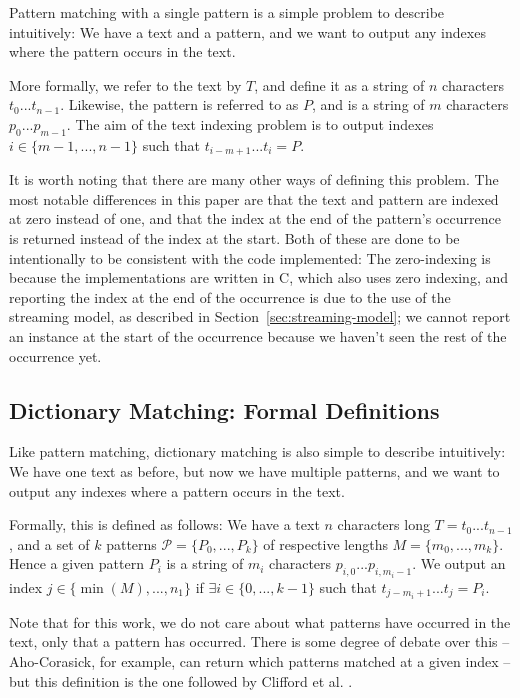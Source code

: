 \documentclass[ %
                    author={Dominic Joseph Moylett},
                    degree={MEng},
                     title={Dictionary Matching with Fingerprints},
                  subtitle={An Empirical Analysis},
                      type={research},
                      year={2015} ]{dissertation}
\begin{document}
Pattern matching with a single pattern is a simple problem to describe intuitively: We have a text and a pattern, and we want to output any indexes where the pattern occurs in the text.

More formally, we refer to the text by $T$, and define it as a string of $n$ characters $t_0...t_{n-1}$. Likewise, the pattern is referred to as $P$, and is a string of $m$ characters $p_0...p_{m-1}$. The aim of the text indexing problem is to output indexes $i \in \{m-1,...,n-1\}$ such that $t_{i-m+1}...t_{i} = P$.

It is worth noting that there are many other ways of defining this problem. The most notable differences in this paper are that the text and pattern are indexed at zero instead of one, and that the index at the end of the pattern's occurrence is returned instead of the index at the start. Both of these are done to be intentionally to be consistent with the code implemented: The zero-indexing is because the implementations are written in C, which also uses zero indexing, and reporting the index at the end of the occurrence is due to the use of the streaming model, as described in Section~\ref{sec:streaming-model}; we cannot report an instance at the start of the occurrence because we haven't seen the rest of the occurrence yet.

\subsection{Dictionary Matching: Formal Definitions}
\label{ssec:dict-matching:definitions}

Like pattern matching, dictionary matching is also simple to describe intuitively: We have one text as before, but now we have multiple patterns, and we want to output any indexes where a pattern occurs in the text.

Formally, this is defined as follows: We have a text $n$ characters long $T = t_0...t_{n-1}$, and a set of $k$ patterns $\mathcal{P} = \{P_0,...,P_k\}$ of respective lengths $M = \{m_0,...,m_k\}$. Hence a given pattern $P_i$ is a string of $m_i$ characters $p_{i,0}...p_{i,m_i-1}$. We output an index $j \in \{\min(M),...,n_1\}$ if $\exists i \in \{0,...,k-1\}$ such that $t_{j-m_i+1}...t_{j} = P_i$.

Note that for this work, we do not care about what patterns have occurred in the text, only that a pattern has occurred. There is some degree of debate over this -- Aho-Corasick, for example, can return which patterns matched at a given index -- but this definition is the one followed by Clifford et al. \cite{2015arXiv150406242C}.
\end{document}
